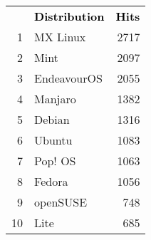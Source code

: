 \documentclass{article}
\newcommand{\head}[1]{%
  \textcolor{black}{\textbf{#1}}}
\begin{document}
\pagestyle{empty}
\begin{table}
  \centering
  \sffamily
  \begin{tabular}{rlr}
    \rowcolor{gray}
     & \head{Distribution} & \head{Hits} \\
     1 & MX Linux    & 2717 \\
     2 & Mint        & 2097 \\
     3 & EndeavourOS & 2055 \\
     4 & Manjaro     & 1382 \\
     5 & Debian      & 1316 \\
     6 & Ubuntu      & 1083 \\
     7 & Pop! OS     & 1063 \\
     8 & Fedora      & 1056 \\
     9 & openSUSE    & 748  \\
    10 & Lite        & 685
  \end{tabular}
\end{table}
\end{document}
